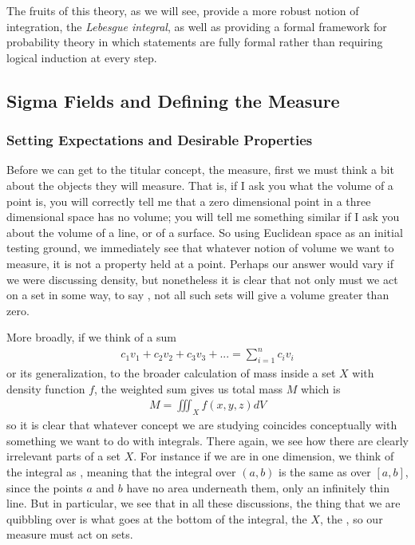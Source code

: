\documentclass[11pt]{article}
\begin{document}
The fruits of this theory, as we will see, provide a more robust notion of integration, the \emph{Lebesgue integral}, as well as providing a formal framework for probability theory in which statements are fully formal rather than requiring logical induction at every step.

\subsection{Sigma Fields and Defining the Measure}

\subsubsection{Setting Expectations and Desirable Properties}

Before we can get to the titular concept, the measure, first we must think a bit about the objects they will measure. That is, if I ask you what the volume of a point is, you will correctly tell me that a zero dimensional point in a three dimensional space has no volume; you will tell me something similar if I ask you about the volume of a line, or of a surface. So using Euclidean space as an initial testing ground, we immediately see that whatever notion of volume we want to measure, it is not a property held at a point. Perhaps our answer would vary if we were discussing density, but nonetheless it is clear that not only must we act on a set in some way, to say , not all such sets will give a volume greater than zero.

More broadly, if we think of a  sum \begin{gather*}
c_1 v_1 + c_2 v_2 + c_3 v_3 + ... = \sum_{i=1}^n c_i v_i
\end{gather*}
or its generalization, to the broader calculation of mass inside a set $X$ with density function $f$, the weighted sum gives us total mass $M$ which is \begin{gather*}
M = \iiint_X f(x,y,z) dV
\end{gather*}
so it is clear that whatever concept we are studying coincides conceptually with something we want to do with integrals. There again, we see how there are clearly irrelevant parts of a set $X$. For instance if we are in one dimension, we think of the integral as , meaning that the integral over $(a,b)$ is the same as over $[a,b]$, since the points $a$ and $b$ have no area underneath them, only an infinitely thin line. But in particular, we see that in all these discussions, the thing that we are quibbling over is what goes at the bottom of the integral, the $X$, the , so our measure must act on sets.
\end{document}
